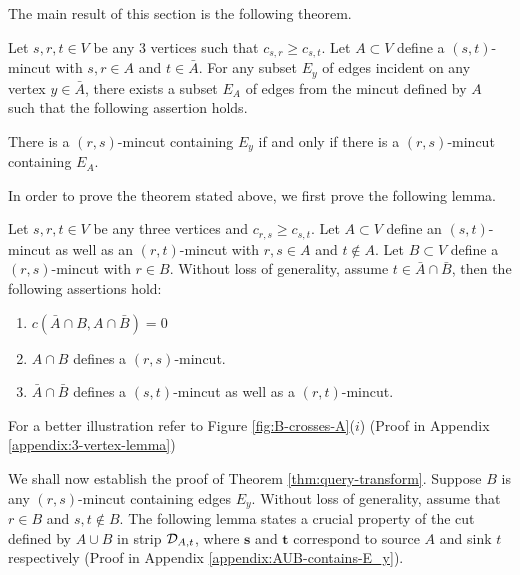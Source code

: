 The main result of this section is the following theorem.


\begin{theorem}
Let $s,r,t\in V$ be any 3 vertices such that $c_{s,r}\ge c_{s,t}$. Let $A\subset V$ define a $(s,t)$-mincut with  $s,r\in A$ and $t\in \bar{A}$. For any subset $E_y$ of edges incident on any vertex $y\in \bar{A}$, there exists a subset $E_A$ of edges from the mincut defined by $A$ such that the following assertion holds.

There is a $(r,s)$-mincut containing $E_y$ if and only if there is a $(r,s)$-mincut containing $E_A$. 
\label{thm:query-transform}
\end{theorem}


\noindent
In order to prove the theorem stated above, we first prove the following lemma.

\begin{lemma}
Let $s,r,t \in V$ be any three vertices and $c_{r,s} \ge c_{s,t}$. Let $A\subset V$ define an $(s,t)$-mincut as well as
an $(r,t)$-mincut
with $r,s\in A$ and $t\notin A$. Let $B\subset V$ define a $(r,s)$-mincut with $r\in B$. Without loss of generality, assume $t \in {\bar A}\cap {\bar B}$, then the following assertions hold:
\begin{enumerate}
\item
$c(\bar{A}\cap B, A\cap \bar{B})=0$
\item  $A\cap B$ defines a $(r,s)$-mincut.
\item  ${\bar A}\cap {\bar B}$ defines a $(s,t)$-mincut as well as a $(r,t)$-mincut.
\end{enumerate}

For a better illustration refer to Figure \ref{fig:B-crosses-A}($i$) (Proof in Appendix \ref{appendix:3-vertex-lemma})
\label{lem:3-vertex-lemma}
\end{lemma}


We shall now establish the proof of Theorem \ref{thm:query-transform}. Suppose $B$ is any $(r,s)$-mincut containing edges $E_y$. Without loss of generality, assume that $r\in B$ and $s,t\notin B$. The following lemma states a crucial property of the cut defined by $A\cup B$ in strip ${\cal D}_{A,t}$, where $\mathbf{s}$ and $\mathbf{t}$ correspond to source $A$ and sink $t$ respectively (Proof in Appendix \ref{appendix:AUB-contains-E_y}).

